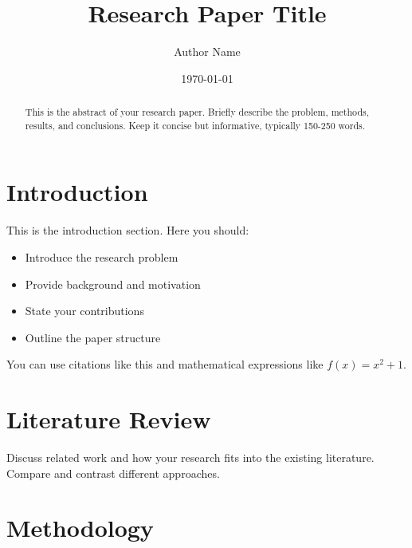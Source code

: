 \documentclass[12pt]{article}
\title{Research Paper Title}
\author{Author Name}
\date{\today}
\begin{document}
\maketitle

\begin{abstract}
This is the abstract of your research paper. Briefly describe the problem, methods, results, and conclusions. Keep it concise but informative, typically 150-250 words.
\end{abstract}

\tableofcontents
\newpage


% 
% 
% 
% 
% 


\section{Introduction}

This is the introduction section. Here you should:
\begin{itemize}
    \item Introduce the research problem
    \item Provide background and motivation
    \item State your contributions
    \item Outline the paper structure
\end{itemize}

You can use citations like this \cite{exampleref} and mathematical expressions like $f(x) = x^2 + 1$.

\section{Literature Review}

Discuss related work and how your research fits into the existing literature. Compare and contrast different approaches.

\section{Methodology}
\end{document}
